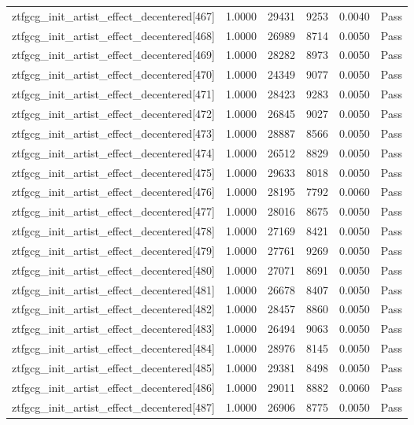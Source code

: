 \begin{table}[htbp]
\begin{tabular}{llrrll}
ztfgcg\_init\_artist\_effect\_decentered[467] & 1.0000 & 29431 & 9253 & 0.0040 & Pass \\
ztfgcg\_init\_artist\_effect\_decentered[468] & 1.0000 & 26989 & 8714 & 0.0050 & Pass \\
ztfgcg\_init\_artist\_effect\_decentered[469] & 1.0000 & 28282 & 8973 & 0.0050 & Pass \\
ztfgcg\_init\_artist\_effect\_decentered[470] & 1.0000 & 24349 & 9077 & 0.0050 & Pass \\
ztfgcg\_init\_artist\_effect\_decentered[471] & 1.0000 & 28423 & 9283 & 0.0050 & Pass \\
ztfgcg\_init\_artist\_effect\_decentered[472] & 1.0000 & 26845 & 9027 & 0.0050 & Pass \\
ztfgcg\_init\_artist\_effect\_decentered[473] & 1.0000 & 28887 & 8566 & 0.0050 & Pass \\
ztfgcg\_init\_artist\_effect\_decentered[474] & 1.0000 & 26512 & 8829 & 0.0050 & Pass \\
ztfgcg\_init\_artist\_effect\_decentered[475] & 1.0000 & 29633 & 8018 & 0.0050 & Pass \\
ztfgcg\_init\_artist\_effect\_decentered[476] & 1.0000 & 28195 & 7792 & 0.0060 & Pass \\
ztfgcg\_init\_artist\_effect\_decentered[477] & 1.0000 & 28016 & 8675 & 0.0050 & Pass \\
ztfgcg\_init\_artist\_effect\_decentered[478] & 1.0000 & 27169 & 8421 & 0.0050 & Pass \\
ztfgcg\_init\_artist\_effect\_decentered[479] & 1.0000 & 27761 & 9269 & 0.0050 & Pass \\
ztfgcg\_init\_artist\_effect\_decentered[480] & 1.0000 & 27071 & 8691 & 0.0050 & Pass \\
ztfgcg\_init\_artist\_effect\_decentered[481] & 1.0000 & 26678 & 8407 & 0.0050 & Pass \\
ztfgcg\_init\_artist\_effect\_decentered[482] & 1.0000 & 28457 & 8860 & 0.0050 & Pass \\
ztfgcg\_init\_artist\_effect\_decentered[483] & 1.0000 & 26494 & 9063 & 0.0050 & Pass \\
ztfgcg\_init\_artist\_effect\_decentered[484] & 1.0000 & 28976 & 8145 & 0.0050 & Pass \\
ztfgcg\_init\_artist\_effect\_decentered[485] & 1.0000 & 29381 & 8498 & 0.0050 & Pass \\
ztfgcg\_init\_artist\_effect\_decentered[486] & 1.0000 & 29011 & 8882 & 0.0060 & Pass \\
ztfgcg\_init\_artist\_effect\_decentered[487] & 1.0000 & 26906 & 8775 & 0.0050 & Pass \\

\end{tabular}
\end{table}
